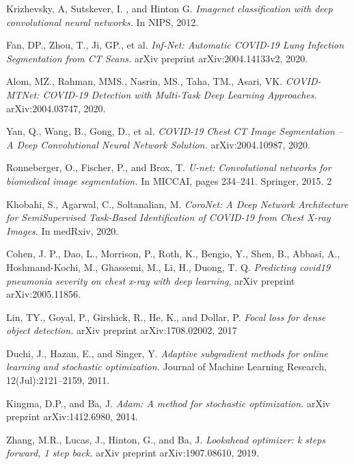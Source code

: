 \begin{thebibliography}{1}
	
	Krizhevsky, A, Sutskever, I. , and Hinton G. \textit{Imagenet classification with deep convolutional neural networks.} In NIPS, 2012.
	
	 Fan, DP., Zhou, T., Ji, GP., et al. \textit{Inf-Net: Automatic COVID-19 Lung Infection Segmentation from CT Scans.} arXiv preprint arXiv:2004.14133v2, 2020.
	
	 Alom, MZ., Rahman, MMS., Nasrin, MS., Taha, TM., Asari, VK. \textit{COVID-MTNet: COVID-19 Detection with Multi-Task Deep Learning Approaches.} arXiv:2004.03747, 2020.
	
	 Yan, Q., Wang, B., Gong, D., et al. \textit{COVID-19 Chest CT Image Segmentation -- A Deep Convolutional Neural Network Solution.} arXiv:2004.10987, 2020.
	
	 Ronneberger, O., Fischer, P., and Brox, T. \textit{U-net: Convolutional networks for biomedical image segmentation.} In MICCAI, pages 234–241. Springer, 2015. 2
	
	 Khobahi, S., Agarwal, C., Soltanalian, M. \textit{CoroNet: A Deep Network Architecture for
		SemiSupervised Task-Based Identification of COVID-19 from Chest X-ray Images.} In medRxiv, 2020.
	
	 Cohen, J. P., Dao, L., Morrison, P., Roth, K., Bengio, Y., Shen, B., Abbasi, A., Hoshmand-Kochi, M., Ghassemi, M., Li, H., Duong, T. Q. \textit{Predicting covid19 pneumonia severity on chest x-ray with deep learning}, arXiv preprint arXiv:2005.11856.
	
	 Lin, TY., Goyal, P., Girshick, R., He, K., and Dollar, P. \textit{Focal loss for dense object detection.} arXiv preprint arXiv:1708.02002, 2017
	
	 Duchi, J., Hazan, E., and Singer, Y. \textit{Adaptive subgradient methods for online learning and stochastic optimization.} Journal of Machine Learning Research, 12(Jul):2121–2159, 2011.
	
	 Kingma, D.P., and Ba, J. \textit{Adam: A method for stochastic optimization.} arXiv preprint arXiv:1412.6980, 2014.
	
	  Zhang, M.R., Lucas, J., Hinton, G., and Ba, J. \textit{Lookahead optimizer: k steps forward, 1 step back.} arXiv preprint arXiv:1907.08610, 2019.
	

\end{thebibliography}
